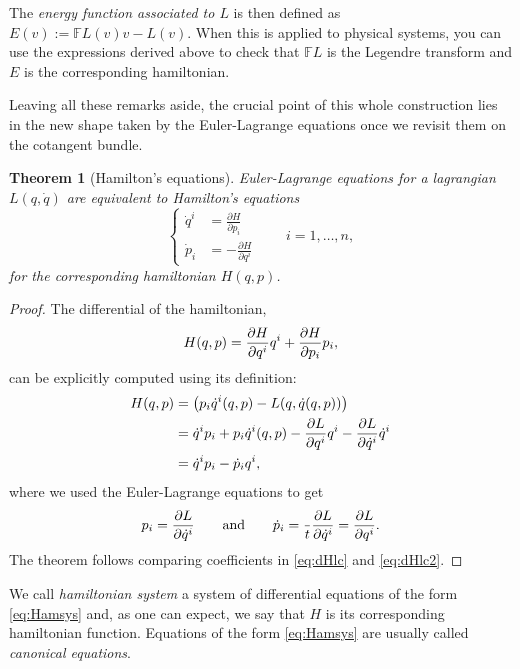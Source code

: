 \documentclass[english,fontsize=11pt,paper=a5,oneside]{scrbook}
\let\d\relax
\newcommand{\d}{\mathrm{d}}
\newtheorem{theorem}{Theorem}[chapter]
\theoremstyle{definition}
\newenvironment{remark}
  {\pushQED{\qed}\renewcommand{\qedsymbol}{$\lozenge$}\remarkx}
  {\popQED\endremarkx}
\begin{document}
\begin{remark}
  The \emph{energy function associated to $L$} is then defined as $E(v) := \mathbb{F}L(v) v - L(v)$. When this is applied to physical systems, you can use the expressions derived above to check that $\mathbb{F}L$ is the Legendre transform and $E$ is the corresponding hamiltonian.
\end{remark}

Leaving all these remarks aside, the crucial point of this whole construction lies in the new shape taken by the Euler-Lagrange equations once we revisit them on the cotangent bundle.

\begin{theorem}[Hamilton's equations]\label{thm:Hameqns}
  Euler-Lagrange equations for a lagrangian $L(q,\dot q)$ are equivalent to \emph{Hamilton's equations}
  \begin{equation}\label{eq:Hamsys}
    \left\lbrace
    \begin{aligned}
      \dot q^i & = \frac{\partial H}{\partial p_i}  \\
      \dot p_i & = -\frac{\partial H}{\partial q^i}
    \end{aligned}
    \right. \qquad i=1,\ldots,n,
  \end{equation}
  for the corresponding hamiltonian $H(q,p)$.
\end{theorem}
\begin{proof}
  The differential of the hamiltonian,
  \begin{equation}\label{eq:dHlc}
    \d H(q,p) = \frac{\partial H}{\partial q^i}\d q^i + \frac{\partial H}{\partial p_i}\d p_i,
  \end{equation}
  can be explicitly computed using its definition:
  \begin{align}
    \d H(q,p) & = \d \left( p_i\dot q^i(q,p) - L(q, \dot q(q,p)) \right)                                                                             \\
              & = \dot q^i \d p_i + p_i \d \dot q^i(q,p) - \frac{\partial L}{\partial q^i} \d q^i - \frac{\partial L}{\partial \dot q^i} \d \dot q^i \\
              & = \dot q^i \d p_i - \dot p_i \d q^i, \label{eq:dHlc2}
  \end{align}
  where we used the Euler-Lagrange equations to get
  \begin{equation}
    p_i = \frac{\partial L}{\partial \dot q^i}
    \qquad\mbox{and}\qquad
    \dot p_i = \frac{\d }{\d t}\frac{\partial L}{\partial \dot q^i} = \frac{\partial L}{\partial q^i}.
  \end{equation}
  The theorem follows comparing coefficients in \eqref{eq:dHlc} and \eqref{eq:dHlc2}.
\end{proof}
We call \emph{hamiltonian system} a system of differential equations of the form \eqref{eq:Hamsys} and, as one can expect, we say that $H$ is its corresponding hamiltonian function. Equations of the form \eqref{eq:Hamsys} are usually called \emph{canonical equations}.
\end{document}
